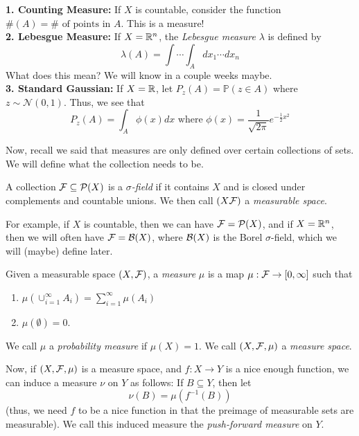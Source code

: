 \textbf{1. Counting Measure:} If $X$ is countable, consider the function $\#(A) = \# \text{ of points in } A$. This is a measure!\\

\textbf{2. Lebesgue Measure:} If $X = \R^n$, the \emph{Lebesgue measure} $\lambda$ is defined by
\[ \lambda(A) = \int \cdots \int_{A} dx_1 \cdots dx_{n} \]
What does this mean? We will know in a couple weeks maybe.\\

\textbf{3. Standard Gaussian:} If $X = \R$, let $P_{z}(A) = \mathbb{P}(z \in A)$ where $z \sim \mathcal{N}(0, 1)$. Thus, we see that
\[ P_{z}(A) = \int_{A} \phi(x) dx \text{ where } \phi(x) = \frac{1}{\sqrt{2\pi}}e^{-\frac{1}{2}x^2} \]

Now, recall we said that measures are only defined over certain collections of sets. We will define what the collection needs to be.

\begin{definition}
    A collection $\cal{F} \subseteq \P(X)$ is a \emph{$\sigma$-field} if it contains $X$ and is closed under complements and countable unions. We then call $(X \cal{F})$ a \emph{measurable space}.
\end{definition}
For example, if $X$ is countable, then we can have $\cal{F} = \P(X)$, and if $X = \R^n$, then we will often have $\cal{F} = \cal{B}(X)$, where $\cal{B}(X)$ is the Borel $\sigma$-field, which we will (maybe) define later.\\

\begin{definition}
    Given a measurable space $(X, \cal{F})$, a \emph{measure} $\mu$ is a map $\mu : \cal{F} \to [0, \infty]$ such that
    \begin{enumerate}
        \item $\mu(\cup_{i = 1}^{\infty} A_i) = \sum_{i = 1}^{\infty} \mu(A_i)$
        \item $\mu(\emptyset) = 0$. 
    \end{enumerate}
    We call $\mu$ a \emph{probability measure} if $\mu(X) = 1$. We call $(X, \cal{F}, \mu)$ a \emph{measure space}.
\end{definition}

Now, if $(X, \cal{F}, \mu)$ is a measure space, and $f : X \to Y$ is a nice enough function, we can induce a measure $\nu$ on $Y$ as follows: If $B \subseteq Y$, then let
\[ \nu(B) = \mu(f^{-1}(B)) \]
(thus, we need $f$ to be a nice function in that the preimage of measurable sets are measurable). We call this induced measure the \emph{push-forward measure} on $Y$.\\


